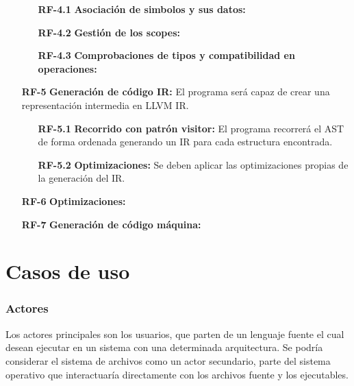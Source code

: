 \begin{enumerate}
	\begin{enumerate}	
		\item[\textbf{RF-4.1}] \textbf{Asociación de simbolos y sus datos:} 
		\item[\textbf{RF-4.2}] \textbf{Gestión de los scopes:} 
		\item[\textbf{RF-4.3}] \textbf{Comprobaciones de tipos y compatibilidad en operaciones:}
	\end{enumerate}	
\item[\textbf{RF-5}] \textbf{Generación de código IR:} El programa será capaz de crear una representación intermedia en LLVM IR.
	\begin{enumerate}	
		\item[\textbf{RF-5.1}] \textbf{Recorrido con patrón visitor:} El programa recorrerá el AST de forma ordenada generando un IR para cada estructura encontrada.
		\item[\textbf{RF-5.2}] \textbf{Optimizaciones:} Se deben aplicar las optimizaciones propias de la generación del IR.
	\end{enumerate}	
\item[\textbf{RF-6}] \textbf{Optimizaciones:} %
\item[\textbf{RF-7}] \textbf{Generación de código máquina:} %
\end{enumerate}

\section{Casos de uso}
\subsubsection{Actores}
Los actores principales son los usuarios, que parten de un lenguaje fuente el cual desean ejecutar en un sistema con una determinada arquitectura. Se podría considerar el sistema de archivos como un actor secundario, parte del sistema operativo que interactuaría directamente con los archivos fuente y los ejecutables.

